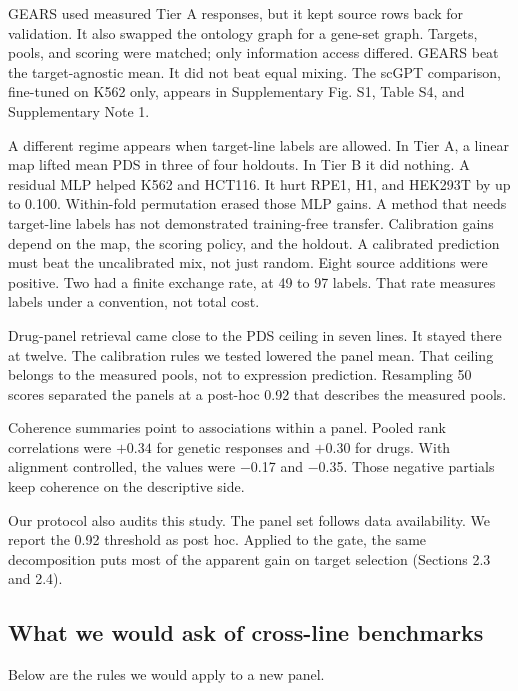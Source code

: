 \documentclass[12pt]{article}
\begin{document}
GEARS used measured Tier A responses, but it kept source rows back for validation. It also swapped the ontology graph for a gene-set graph. Targets, pools, and scoring were matched; only information access differed. GEARS beat the target-agnostic mean. It did not beat equal mixing. The scGPT comparison, fine-tuned on K562 only, appears in Supplementary Fig. S1, Table S4, and Supplementary Note 1.

A different regime appears when target-line labels are allowed. In Tier A, a linear map lifted mean PDS in three of four holdouts. In Tier B it did nothing. A residual MLP helped K562 and HCT116. It hurt RPE1, H1, and HEK293T by up to 0.100. Within-fold permutation erased those MLP gains. A method that needs target-line labels has not demonstrated training-free transfer. Calibration gains depend on the map, the scoring policy, and the holdout. A calibrated prediction must beat the uncalibrated mix, not just random. Eight source additions were positive. Two had a finite exchange rate, at 49 to 97 labels. That rate measures labels under a convention, not total cost.

Drug-panel retrieval came close to the PDS ceiling in seven lines. It stayed there at twelve. The calibration rules we tested lowered the panel mean. That ceiling belongs to the measured pools, not to expression prediction. Resampling 50 scores separated the panels at a post-hoc 0.92 that describes the measured pools.

Coherence summaries point to associations within a panel. Pooled rank correlations were $+0.34$ for genetic responses and $+0.30$ for drugs. With alignment controlled, the values were $-$0.17 and $-$0.35. Those negative partials keep coherence on the descriptive side.

Our protocol also audits this study. The panel set follows data availability. We report the 0.92 threshold as post hoc. Applied to the gate, the same decomposition puts most of the apparent gain on target selection (Sections 2.3 and 2.4).

\subsection*{What we would ask of cross-line benchmarks}

Below are the rules we would apply to a new panel.
\end{document}
